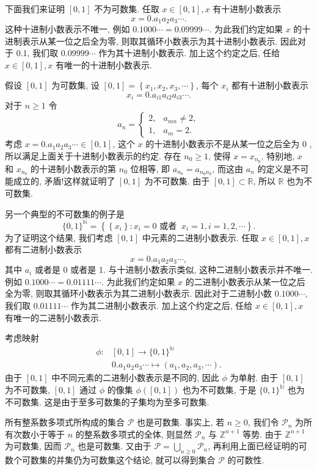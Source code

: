 \documentclass[openany]{ctexbook}
\theoremstyle{kaiti}
\theoremstyle{normal}
\begin{document}
下面我们来证明 $[0,1]$ 不为可数集. 任取 $x \in[0,1], x$ 有十进制小数表示
$$
x=0. a_1 a_2 a_3 \cdots.
$$
这种十进制小数表示不唯一, 例如 $0.1000 \cdots=0.09999 \cdots$. 为此我们约定如果 $x$ 的十进制表示从某一位之后全为零, 则取其循环小数表示为其十进制小数表示. 因此对于 0.1, 我们取 $0.09999 \cdots$ 作为其十进制小数表示. 加上这个约定之后, 任给 $x \in[0,1], x$ 有唯一的十进制小数表示.

假设 $[0,1]$ 为可数集, 设 $[0,1]=\left\{x_1, x_2, x_3, \cdots\right\}$, 每个 $x_{i}$ 都有十进制小数表示 
$$
x_{i}=0. a_{i 1} a_{i 2} a_{i 3} \cdots.
$$
对于 $n \geqslant 1$ 令
$$
  a_n= 
  \begin{cases}
    2, & a_{m n} \neq 2, \\ 
    1, & a_m=2.
  \end{cases}
$$
考虑 $x=0. a_1 a_2 a_3 \cdots \in[0,1]$, 这个 $x$ 的十进制小数表示不是从某一位之后全为 0 , 所以满足上面关于十进制小数表示的约定. 存在 $n_0 \geqslant 1$, 使得 $x=x_{n_0}$. 特别地, $x$ 和 $x_{n_0}$ 的十进制小数表示的第 $n_0$ 位相等, 即 $a_{n_0}=a_{n_0 n_0}$, 而这由 $a_n$ 的定义是不可能成立的, 矛盾!这样就证明了 $[0,1]$ 为不可数集. 由于 $[0,1] \subset \mathbb{R}$, 所以 $\mathbb{R}$ 也为不可数集.

另一个典型的不可数集的例子是
$$
\{0,1\}^{\mathbb{N}}=\left\{\left\{x_{i}\right\}: x_{i}=0 \text { 或者 }~x_{i}=1, i=1,2, \cdots\right\}.
$$
为了证明这个结果, 我们考虑 $[0,1]$ 中元素的二进制小数表示. 任取 $x \in[0,1], x$ 都有二进制小数表示
$$
x=0. a_1 a_2 a_3 \cdots,
$$
其中 $a_{i}$ 或者是 0 或者是 1. 与十进制小数表示类似, 这种二进制小数表示并不唯一. 例如 $0.1000 \cdots=0.01111 \cdots$. 为此我们约定如果 $x$ 的二进制小数表示从某一位之后全为零, 则取其循环小数表示为其二进制小数表示. 因此对于二进制小数 $0.1000 \cdots$, 我们取 $0.01111 \cdots$ 作为其二进制小数表示. 加上这个约定之后, 任给 $x \in[0,1], x$ 有唯一的二进制小数表示. 

考虑映射
$$
\begin{aligned}
\phi: & {[0,1] \rightarrow\{0,1\}^{\mathbb{N}} } \\
& 0. a_1 a_2 a_3 \cdots \mapsto\left(a_1, a_2, a_3, \cdots\right).
\end{aligned}
$$
由于 $[0,1]$ 中不同元素的二进制小数表示是不同的, 因此 $\phi$ 为单射. 由于 $[0,1]$ 为不可数集, $[0,1]$ 通过 $\phi$ 的像集 $\phi([0,1])$ 也为不可数集, 于是 $\{0,1\}^{\mathbb{N}}$ 也为不可数集. 这是由于至多可数集的子集均为至多可数集.

所有整系数多项式所构成的集合 $\mathcal{P}$ 也是可数集. 事实上, 若 $n \geqslant 0$, 我们令 $\mathcal{P}_n$ 为所有次数小于等于 $n$ 的整系数多项式的全体, 则显然 $\mathcal{P}_n$ 与 $\mathbb{Z}^{n+1}$ 等势. 由于 $\mathbb{Z}^{n+1}$ 为可数集, 因而 $\mathcal{P}_n$ 也是可数集. 又由于 $\mathcal{P}=\bigcup_{n \geqslant 0} \mathcal{P}_n$, 再利用上面已经证明的可数个可数集的并集仍为可数集这个结论, 就可以得到集合 $\mathcal{P}$ 的可数性.
\end{document}
